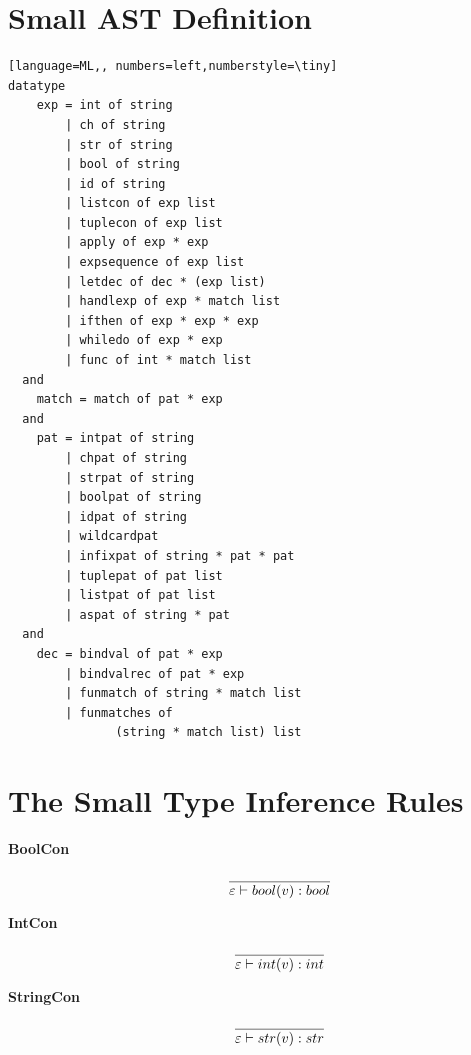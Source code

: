 \documentclass[10pt]{luthercs}
\begin{document}
\section{Small AST Definition}
\label{astdef}
{\small
\begin{lstlisting}[language=ML,, numbers=left,numberstyle=\tiny]
datatype
    exp = int of string
        | ch of string
        | str of string
        | bool of string
        | id of string
        | listcon of exp list
        | tuplecon of exp list
        | apply of exp * exp
        | expsequence of exp list
        | letdec of dec * (exp list)
        | handlexp of exp * match list
        | ifthen of exp * exp * exp
        | whiledo of exp * exp
        | func of int * match list
  and
    match = match of pat * exp
  and
    pat = intpat of string
        | chpat of string
        | strpat of string
        | boolpat of string
        | idpat of string
        | wildcardpat
        | infixpat of string * pat * pat
        | tuplepat of pat list
        | listpat of pat list
        | aspat of string * pat
  and
    dec = bindval of pat * exp
        | bindvalrec of pat * exp
        | funmatch of string * match list
        | funmatches of 
               (string * match list) list 
\end{lstlisting}

\section{The Small Type Inference Rules}
\label{infrules}

\begin{description}
\item[{\textbf{BoolCon}}] \begin{gather}
\begin{split}\frac{}{\varepsilon\vdash bool(v) : bool}\end{split}\notag
\end{gather}
\end{description}


\begin{description}
\item[{\textbf{IntCon}}] \begin{gather}
\begin{split}\frac{}{\varepsilon\vdash int(v) : int}\end{split}\notag
\end{gather}
\end{description}


\begin{description}
\item[{\textbf{StringCon}}] \begin{gather}
\begin{split}\frac{}{\varepsilon\vdash str(v) : str}\end{split}\notag
\end{gather}
\end{description}


}
\end{document}
